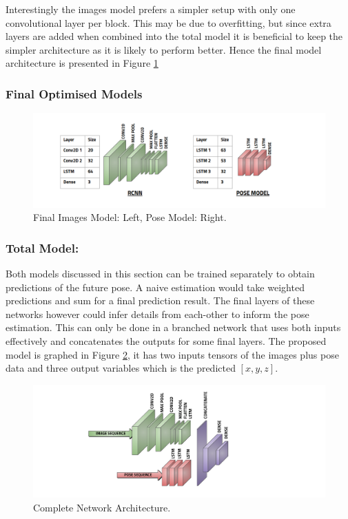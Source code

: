 \documentclass[11pt,twoside]{report}
\begin{document}
Interestingly the images model prefers a simpler setup with only one convolutional layer per block. This may be due to overfitting, but since extra layers are added when combined into the total model it is beneficial to keep the simpler architecture as it is likely to perform better. Hence the final model architecture is presented in Figure \ref{final_models}


\subsubsection{Final Optimised Models}

\noindent \begin{figure}[h!]
	\includegraphics[width = 1.0\hsize]{figures/final_models.png}
	\caption{Final Images Model: Left, Pose Model: Right.}
	\label{final_models}
\end{figure}


\subsubsection{Total Model:}
Both models discussed in this section can be trained separately to obtain predictions of the future pose. A naive estimation would take weighted predictions and sum for a final prediction result. The final layers of these networks however could infer details from each-other to inform the pose estimation. This can only be done in a branched network that uses both inputs effectively and concatenates the outputs for some final layers. The proposed model is graphed in Figure \ref{total_network_architecture}, it has two inputs tensors of the images plus pose data and three output variables which is the predicted $[x,y,z]$.

\noindent \begin{figure}[h!]
	\includegraphics[width = 1.0\hsize]{figures/final_model.png}
	\caption{Complete Network Architecture.}
	\label{total_network_architecture}
\end{figure}
\end{document}
